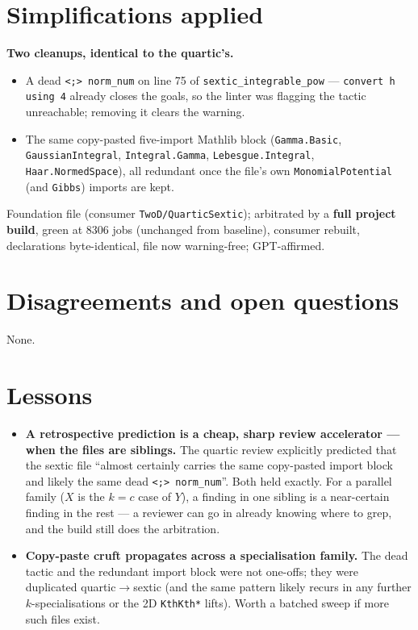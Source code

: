 \documentclass[11pt]{article}
\begin{document}
\section{Simplifications applied}
\textbf{Two cleanups, identical to the quartic's.}
\begin{itemize}[noitemsep]
  \item A dead \texttt{<;> norm\_num} on line 75 of \texttt{sextic\_integrable\_pow} --- \texttt{convert h
    using 4} already closes the goals, so the linter was flagging the tactic unreachable; removing it clears
    the warning.
  \item The same copy-pasted five-import Mathlib block (\texttt{Gamma.Basic}, \texttt{GaussianIntegral},
    \texttt{Integral.Gamma}, \texttt{Lebesgue.Integral}, \texttt{Haar.NormedSpace}), all redundant once the
    file's own \texttt{MonomialPotential} (and \texttt{Gibbs}) imports are kept.
\end{itemize}
Foundation file (consumer \texttt{TwoD/QuarticSextic}); arbitrated by a \textbf{full project build}, green at
$8306$ jobs (unchanged from baseline), consumer rebuilt, declarations byte-identical, file now warning-free;
GPT-affirmed.

\section{Disagreements and open questions}
None.

\section{Lessons}
\begin{itemize}[noitemsep]
  \item \textbf{A retrospective prediction is a cheap, sharp review accelerator --- when the files are
    siblings.} The quartic review explicitly predicted that the sextic file ``almost certainly carries the
    same copy-pasted import block and likely the same dead \texttt{<;> norm\_num}''. Both held exactly. For a
    parallel family ($X$ is the $k=c$ case of $Y$), a finding in one sibling is a near-certain finding in the
    rest --- a reviewer can go in already knowing where to grep, and the build still does the arbitration.
  \item \textbf{Copy-paste cruft propagates across a specialisation family.} The dead tactic and the redundant
    import block were not one-offs; they were duplicated quartic$\to$sextic (and the same pattern likely
    recurs in any further $k$-specialisations or the 2D \texttt{KthKth*} lifts). Worth a batched sweep if more
    such files exist.
\end{itemize}
\end{document}
